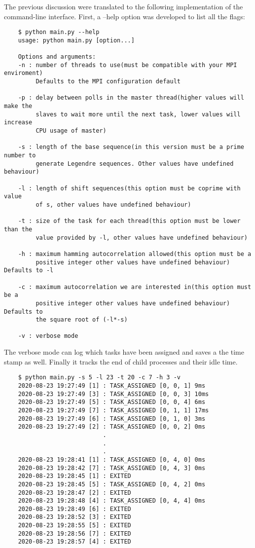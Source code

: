The previous discussion were translated to the following implementation of the command-line interface.
  First, a --help option was developed to list all the flags:
  \begin{lstlisting}
    $ python main.py --help
    usage: python main.py [option...]

    Options and arguments:
    -n : number of threads to use(must be compatible with your MPI enviroment)
         Defaults to the MPI configuration default

    -p : delay between polls in the master thread(higher values will make the
         slaves to wait more until the next task, lower values will increase
         CPU usage of master)

    -s : length of the base sequence(in this version must be a prime number to
         generate Legendre sequences. Other values have undefined behaviour)

    -l : length of shift sequences(this option must be coprime with value
         of s, other values have undefined behaviour)

    -t : size of the task for each thread(this option must be lower than the
         value provided by -l, other values have undefined behaviour)

    -h : maximum hamming autocorrelation allowed(this option must be a
         positive integer other values have undefined behaviour) Defaults to -l

    -c : maximum autocorrelation we are interested in(this option must be a
         positive integer other values have undefined behaviour) Defaults to
         the square root of (-l*-s)

    -v : verbose mode
  \end{lstlisting}

  The verbose mode can log which tasks have been assigned and saves a the time stamp as well. Finally
   it tracks the end of child processes and their idle time.

  \begin{lstlisting}
    $ python main.py -s 5 -l 23 -t 20 -c 7 -h 3 -v
    2020-08-23 19:27:49 [1] : TASK_ASSIGNED [0, 0, 1] 9ms
    2020-08-23 19:27:49 [3] : TASK_ASSIGNED [0, 0, 3] 10ms
    2020-08-23 19:27:49 [5] : TASK_ASSIGNED [0, 0, 4] 6ms
    2020-08-23 19:27:49 [7] : TASK_ASSIGNED [0, 1, 1] 17ms
    2020-08-23 19:27:49 [6] : TASK_ASSIGNED [0, 1, 0] 3ms
    2020-08-23 19:27:49 [2] : TASK_ASSIGNED [0, 0, 2] 0ms
                            .
                            .
                            .
    2020-08-23 19:28:41 [1] : TASK_ASSIGNED [0, 4, 0] 0ms
    2020-08-23 19:28:42 [7] : TASK_ASSIGNED [0, 4, 3] 0ms
    2020-08-23 19:28:45 [1] : EXITED
    2020-08-23 19:28:45 [5] : TASK_ASSIGNED [0, 4, 2] 0ms
    2020-08-23 19:28:47 [2] : EXITED
    2020-08-23 19:28:48 [4] : TASK_ASSIGNED [0, 4, 4] 0ms
    2020-08-23 19:28:49 [6] : EXITED
    2020-08-23 19:28:52 [3] : EXITED
    2020-08-23 19:28:55 [5] : EXITED
    2020-08-23 19:28:56 [7] : EXITED
    2020-08-23 19:28:57 [4] : EXITED

  \end{lstlisting}

